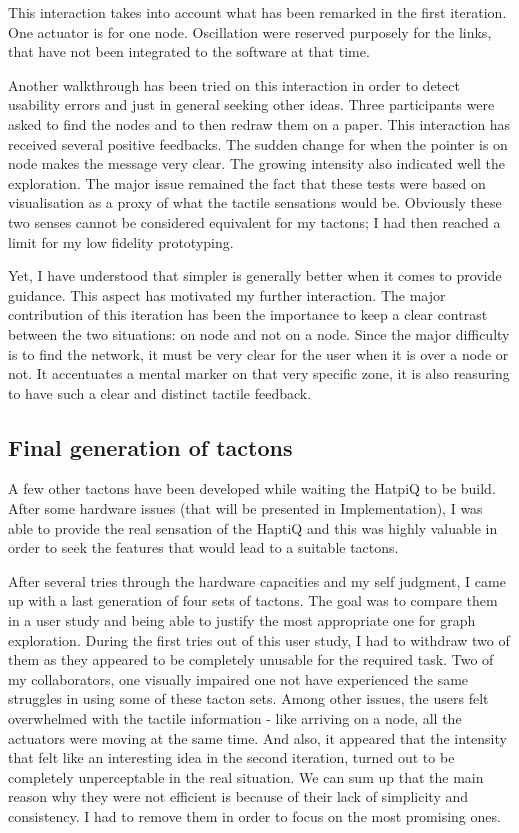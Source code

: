 This interaction takes into account what has been remarked in the first
iteration. One actuator is for one node. Oscillation were reserved
purposely for the links, that have not been integrated to the software
at that time.

Another walkthrough has been tried on this interaction in order to
detect usability errors and just in general seeking other ideas. Three participants were asked to find the nodes and to then redraw them on a paper.
This interaction has received several positive feedbacks. The sudden change
for when the pointer is on node makes the message very clear. The
growing intensity also indicated well the exploration. The major issue
remained the fact that these tests were based on visualisation as a
proxy of what the tactile sensations would be. Obviously these two
senses cannot be considered equivalent for my tactons; I had then
reached a limit for my low fidelity prototyping.

Yet, I have understood that simpler is generally better when it comes to
provide guidance. This aspect has motivated my further interaction. The
major contribution of this iteration has been the importance to keep a
clear contrast between the two situations: on node and not on a node.
Since the major difficulty is to find the network, it must be very clear
for the user when it is over a node or not. It accentuates a mental
marker on that very specific zone, it is also reasuring to have such a
clear and distinct tactile feedback.

\subsection{Final generation of
tactons}\label{final-generation-of-tactons}

A few other tactons have been developed while waiting the HatpiQ to be
build. After some hardware issues (that will be presented in
Implementation), I was able to provide the real sensation of the HaptiQ
and this was highly valuable in order to seek the features that would
lead to a suitable tactons.

After several tries through the hardware capacities and my self
judgment, I came up with a last generation of four sets of tactons. The
goal was to compare them in a user study and being able to justify the
most appropriate one for graph exploration. During the first tries out
of this user study, I had to withdraw two of them as they appeared to be
completely unusable for the required task. Two of my collaborators, one
visually impaired one not have experienced the same struggles in using
some of these tacton sets. Among other issues, the users felt
overwhelmed with the tactile information - like arriving on a node, all
the actuators were moving at the same time. And also, it appeared that
the intensity that felt like an interesting idea in the second
iteration, turned out to be completely unperceptable in the real
situation. We can sum up that the main reason why they were not
efficient is because of their lack of simplicity and consistency. I had
to remove them in order to focus on the most promising ones.

